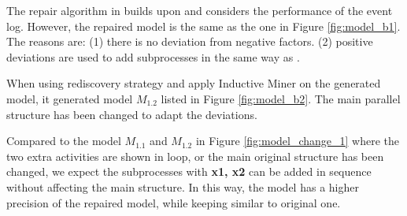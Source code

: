 The repair algorithm in  \cite{dees2017enhancing} builds upon  \cite{fahland2015model} and considers the performance of the event log. However, the repaired model is the same as the one in Figure \ref{fig:model_b1}. The reasons are: (1) there is no deviation from negative factors. (2) positive deviations are used to add subprocesses in the same way as  \cite{fahland2015model}. 

When using rediscovery strategy and apply Inductive Miner on the generated model, it generated model $M_{1.2}$ listed in Figure \ref{fig:model_b2}. The main parallel structure has been changed to adapt the deviations.


Compared to the model $M_{1.1}$ and $M_{1.2}$ in Figure \ref{fig:model_change_1} where the two extra activities are shown in loop, or the main original structure has been changed, we expect the subprocesses with \textbf{x1, x2} can be added in sequence without affecting the main structure. In this way, the model has a higher precision of the repaired model, while keeping similar to original one. %

